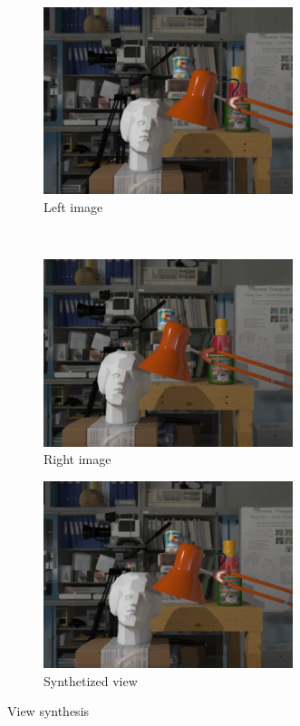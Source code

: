 \begin{figure}[h!]
\centering
\begin{subfigure}[]{0.4\textwidth}
\centering
\includegraphics[width=0.8\textwidth]{./img/left_watermarked.png}
\caption{\small{Left image}}
\label{fig:vs1}
\end{subfigure}%
~ %
\begin{subfigure}[]{0.4\textwidth}
\centering
\includegraphics[width= 0.8\textwidth]{./img/right_watermarked.png}
\caption{\small{Right image}}
\label{fig:vs2}
  \end{subfigure}
\begin{subfigure}[]{0.4\textwidth}
\centering
\includegraphics[width=0.8\textwidth]{./img/synth_view_watermarked.png}
\caption{\small{Synthetized view}}
\label{fig:vs3}
\end{subfigure}
\caption{\small{View synthesis}\label{vs}}
\end{figure}
